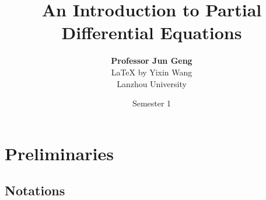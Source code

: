 \documentclass[oneside]{book}
\def\notetitle{An Introduction to Partial Differential Equations}
\def\noteauthor{
	\textbf{Professor Jun Geng} \\ 
	{\LaTeX} by Yixin Wang\\
	Lanzhou University}
\def\notedate{Semester 1}
\begin{document}
	\title{\textbf{
			\LARGE{\notetitle} \vspace*{10\baselineskip}}
	}
	\author{\noteauthor}
	\date{\notedate}
	
	\maketitle
	\newpage
	
	\tableofcontents
	\newpage
	
	
	\chapter{Preliminaries}
	\section{Notations}
\end{document}
